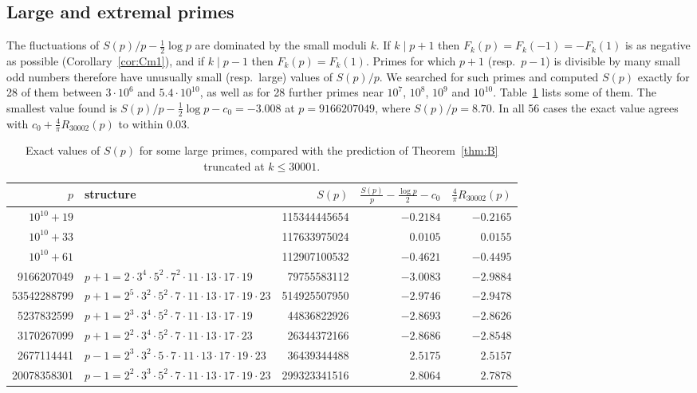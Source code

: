 \subsection{Large and extremal primes}\label{subsec:extremal-primes}
The fluctuations of $S(p)/p-\frac12\log p$ are dominated by the small moduli $k$. If $k\mid p{+}1$ then $F_k(p)=F_k(-1)=-F_k(1)$ is as negative as possible (Corollary~\ref{cor:Cm1}), and if $k\mid p-1$ then $F_k(p)=F_k(1)$. Primes for which $p+1$ (resp.\ $p-1$) is divisible by many small odd numbers therefore have unusually small (resp.\ large) values of $S(p)/p$. We searched for such primes and computed $S(p)$ exactly for 28 of them between $3\cdot 10^6$ and $5.4\cdot 10^{10}$, as well as for 28 further primes near $10^7$, $10^8$, $10^9$ and $10^{10}$. Table~\ref{tab:large-primes} lists some of them. The smallest value found is $S(p)/p-\frac12\log p-c_0=-3.008$ at $p=9166207049$, where $S(p)/p=8.70$. In all 56 cases the exact value agrees with $c_0+\frac4\pi R_{30002}(p)$ to within 0.03.

\begin{table}[ht]
\small
\begin{tabular}{rlrrr}
\toprule
$p$ & structure & $S(p)$ & $\frac{S(p)}{p}-\frac{\log p}{2}-c_0$ & $\frac4\pi R_{30002}(p)$\\
\midrule
$10^{10}+19$ & & 115344445654 & $-0.2184$ & $-0.2165$\\
$10^{10}+33$ & & 117633975024 & $0.0105$ & $0.0155$\\
$10^{10}+61$ & & 112907100532 & $-0.4621$ & $-0.4495$\\
9166207049 & $p+1=2\cdot 3^4\cdot 5^2\cdot 7^2\cdot 11\cdot 13\cdot 17\cdot 19$ & 79755583112 & $-3.0083$ & $-2.9884$\\
53542288799 & $p+1=2^5\cdot 3^2\cdot 5^2\cdot 7\cdot 11\cdot 13\cdot 17\cdot 19\cdot 23$ & 514925507950 & $-2.9746$ & $-2.9478$\\
5237832599 & $p+1=2^3\cdot 3^4\cdot 5^2\cdot 7\cdot 11\cdot 13\cdot 17\cdot 19$ & 44836822926 & $-2.8693$ & $-2.8626$\\
3170267099 & $p+1=2^2\cdot 3^4\cdot 5^2\cdot 7\cdot 11\cdot 13\cdot 17\cdot 23$ & 26344372166 & $-2.8686$ & $-2.8548$\\
2677114441 & $p-1=2^3\cdot 3^2\cdot 5\cdot 7\cdot 11\cdot 13\cdot 17\cdot 19\cdot 23$ & 36439344488 & $2.5175$ & $2.5157$\\
20078358301 & $p-1=2^2\cdot 3^3\cdot 5^2\cdot 7\cdot 11\cdot 13\cdot 17\cdot 19\cdot 23$ & 299323341516 & $2.8064$ & $2.7878$\\
\bottomrule
\end{tabular}
\caption{Exact values of $S(p)$ for some large primes, compared with the prediction of Theorem~\ref{thm:B} truncated at $k\le 30001$.}\label{tab:large-primes}
\end{table}

